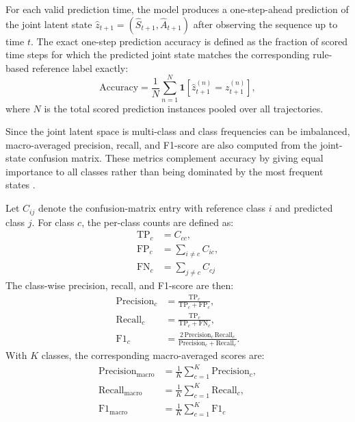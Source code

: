 For each valid prediction time, the model produces a one-step-ahead prediction of the joint latent state
\(
\hat{z}_{t+1} = (\hat{S}_{t+1}, \hat{A}_{t+1})
\)
after observing the sequence up to time $t$. 
The exact one-step prediction accuracy is defined as the fraction of scored time steps for which the predicted joint state matches 
the corresponding 
rule-based reference label exactly:
\begin{equation}
\mathrm{Accuracy}
=
\frac{1}{N}
\sum_{n=1}^{N}
\mathbf{1}\!\left[
\hat{z}_{t+1}^{(n)} = z_{t+1}^{(n)}
\right],
\end{equation}
where $N$ is the total scored prediction instances pooled over all trajectories.

\par Since the joint latent space is multi-class and class frequencies can be imbalanced, macro-averaged precision, recall, and F1-score 
are also computed from the joint-state confusion matrix. 
These metrics complement accuracy by giving equal importance to all classes rather than being dominated by the most frequent 
states \cite{Sokolova2009}.

Let $C_{ij}$ denote the confusion-matrix entry with reference class $i$ and predicted class $j$.
For class $c$, the per-class counts are defined as:
\begin{align}
\mathrm{TP}_c &= C_{cc}, \\
\mathrm{FP}_c &= \sum_{i \neq c} C_{ic}, \\
\mathrm{FN}_c &= \sum_{j \neq c} C_{cj}
\end{align}
The class-wise precision, recall, and F1-score are then:
\begin{align}
\mathrm{Precision}_c &= \frac{\mathrm{TP}_c}{\mathrm{TP}_c + \mathrm{FP}_c}, \\
\mathrm{Recall}_c &= \frac{\mathrm{TP}_c}{\mathrm{TP}_c + \mathrm{FN}_c}, \\
\mathrm{F1}_c &= \frac{2\,\mathrm{Precision}_c\,\mathrm{Recall}_c}{\mathrm{Precision}_c + \mathrm{Recall}_c}.
\end{align}
With $K$ classes, the corresponding macro-averaged scores are:
\begin{align}
\mathrm{Precision}_{\mathrm{macro}} &= \frac{1}{K}\sum_{c=1}^{K} \mathrm{Precision}_c, \\
\mathrm{Recall}_{\mathrm{macro}} &= \frac{1}{K}\sum_{c=1}^{K} \mathrm{Recall}_c, \\
\mathrm{F1}_{\mathrm{macro}} &= \frac{1}{K}\sum_{c=1}^{K} \mathrm{F1}_c
\end{align}


